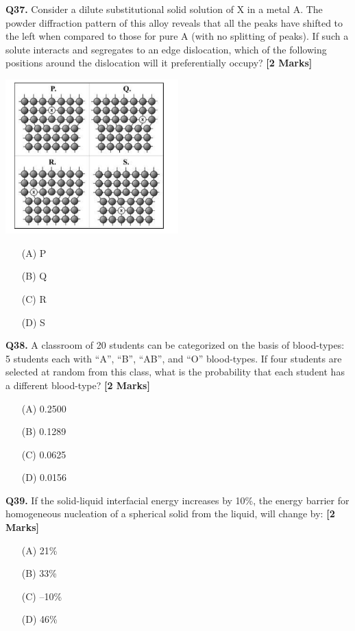 \documentclass[11pt]{article}
\newcommand{\questionb}[2]{
    \noindent\textbf{Q#2.} #1 \hfill \textbf{[2 Marks]}
}
\begin{document}
\questionb{Consider a dilute substitutional solid solution of X in a metal A. The powder diffraction pattern of this alloy reveals that all the peaks have shifted to the left when compared to those for pure A (with no splitting of peaks). If such a solute interacts and segregates to an edge dislocation, which of the following positions around the dislocation will it preferentially occupy?}{37}
\begin{center}
\includegraphics[width=0.5\textwidth]{figures/37.png}
\end{center}
\begin{enumerate}
    \item[(A)] P  
    \item[(B)] Q  
    \item[(C)] R  
    \item[(D)] S  
\end{enumerate}
\vspace{0.5cm}

\questionb{A classroom of 20 students can be categorized on the basis of blood-types: 5 students each with “A”, “B”, “AB”, and “O” blood-types. If four students are selected at random from this class, what is the probability that each student has a different blood-type?}{38}
\begin{enumerate}
    \item[(A)] 0.2500  
    \item[(B)] 0.1289  
    \item[(C)] 0.0625  
    \item[(D)] 0.0156  
\end{enumerate}
\vspace{0.5cm}

\questionb{If the solid-liquid interfacial energy increases by 10\%, the energy barrier for homogeneous nucleation of a spherical solid from the liquid, will change by:}{39}
\begin{enumerate}
    \item[(A)] 21\%  
    \item[(B)] 33\%  
    \item[(C)] –10\%  
    \item[(D)] 46\%  
\end{enumerate}
\vspace{0.5cm}
\end{document}
